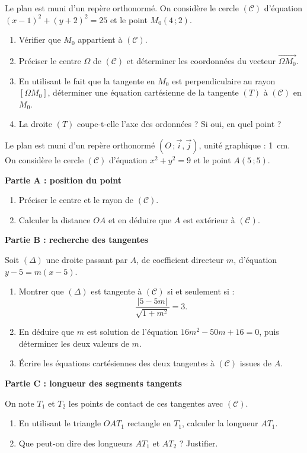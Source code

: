 \documentclass[11pt]{article}
\newcounter{popsec}
\newcounter{popsub}
\newcommand{\courssub}[1]{%
  \stepcounter{popsub}%
  \par\vspace{9pt}\noindent{\popxbold\fontsize{11.5}{13}\selectfont\color{popink}{\color{poporange}\thepopsec.\thepopsub}\hspace{6pt}#1}\par\nopagebreak\vspace{4pt}
}
\begin{document}
\begin{exercice}
Le plan est muni d'un repère orthonormé. On considère le cercle $(\mathscr{C})$ d'équation $(x - 1)^2 + (y + 2)^2 = 25$ et le point $M_0(4\,;2)$.
\begin{enumerate}
\item Vérifier que $M_0$ appartient à $(\mathscr{C})$.
\item Préciser le centre $\Omega$ de $(\mathscr{C})$ et déterminer les coordonnées du vecteur $\overrightarrow{\Omega M_0}$.
\item En utilisant le fait que la tangente en $M_0$ est perpendiculaire au rayon $[\Omega M_0]$, déterminer une équation cartésienne de la tangente $(T)$ à $(\mathscr{C})$ en $M_0$.
\item La droite $(T)$ coupe-t-elle l'axe des ordonnées ? Si oui, en quel point ?
\end{enumerate}
\end{exercice}

\courssub{Je me prépare au Probatoire}

\begin{exercice}
Le plan est muni d'un repère orthonormé $(O\,;\vec{i},\vec{j})$, unité graphique : \SI{1}{cm}. On considère le cercle $(\mathscr{C})$ d'équation $x^2 + y^2 = 9$ et le point $A(5\,;5)$.

\textbf{Partie A : position du point}
\begin{enumerate}
\item Préciser le centre et le rayon de $(\mathscr{C})$.
\item Calculer la distance $OA$ et en déduire que $A$ est extérieur à $(\mathscr{C})$.
\end{enumerate}

\textbf{Partie B : recherche des tangentes}

Soit $(\Delta)$ une droite passant par $A$, de coefficient directeur $m$, d'équation $y - 5 = m(x - 5)$.
\begin{enumerate}
\item Montrer que $(\Delta)$ est tangente à $(\mathscr{C})$ si et seulement si :
\[ \dfrac{|5 - 5m|}{\sqrt{1 + m^2}} = 3. \]
\item En déduire que $m$ est solution de l'équation $16m^2 - 50m + 16 = 0$, puis déterminer les deux valeurs de $m$.
\item Écrire les équations cartésiennes des deux tangentes à $(\mathscr{C})$ issues de $A$.
\end{enumerate}

\textbf{Partie C : longueur des segments tangents}

On note $T_1$ et $T_2$ les points de contact de ces tangentes avec $(\mathscr{C})$.
\begin{enumerate}
\item En utilisant le triangle $OAT_1$ rectangle en $T_1$, calculer la longueur $AT_1$.
\item Que peut-on dire des longueurs $AT_1$ et $AT_2$ ? Justifier.
\end{enumerate}
\end{exercice}
\end{document}
